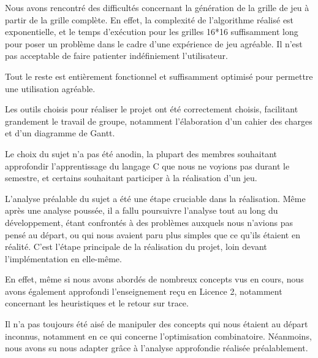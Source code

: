 \documentclass[a4paper, 12pt]{article}
\begin{document}
	\par Nous avons rencontré des difficultés concernant la génération de la grille de jeu à partir de la grille complète. En effet, la complexité de l'algorithme réalisé est exponentielle, et le temps d'exécution pour les grilles 16*16 suffisamment long pour poser un problème dans le cadre d'une expérience de jeu agréable. Il n'est pas acceptable de faire patienter indéfiniement l'utilisateur.
	\par Tout le reste est entièrement fonctionnel et suffisamment optimisé pour permettre une utilisation agréable.
	\par Les outils choisis pour réaliser le projet ont été correctement choisis, facilitant grandement le travail de groupe, notamment l'élaboration d'un cahier des charges et d'un diagramme de Gantt.
	\par Le choix du sujet n'a pas été anodin, la plupart des membres souhaitant approfondir l'apprentissage du langage C que nous ne voyions pas durant le semestre, et certains souhaitant participer à la réalisation d'un jeu.
	\par L'analyse préalable du sujet a été une étape cruciable dans la réalisation. Même après une analyse poussée, il a fallu poursuivre l'analyse tout au long du développement, étant confrontés à des problèmes auxquels nous n'avions pas pensé au départ, ou qui nous avaient paru plus simples que ce qu'ils étaient en réalité. C'est l'étape principale de la réalisation du projet, loin devant l'implémentation en elle-même.
	\par En effet, même si nous avons abordés de nombreux concepts vus en cours, nous avons également approfondi l'enseignement reçu en Licence 2, notamment concernant les heuristiques et le retour sur trace.
	\par Il n'a pas toujours été aisé de manipuler des concepts qui nous étaient au départ inconnus, notamment en ce qui concerne l'optimisation combinatoire. Néanmoins, nous avons su nous adapter grâce à l'analyse approfondie réalisée préalablement.\\
\end{document}
